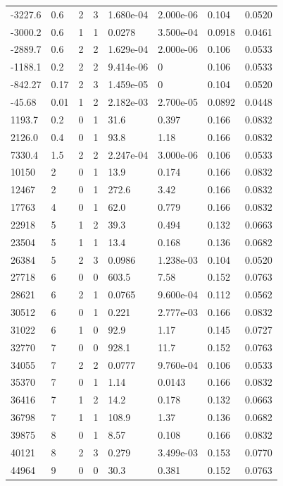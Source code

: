 \documentclass[preview]{standalone}
\begin{document}
{{\begin{tabular}{L{1.2cm}C{1.2cm} C{0.3cm}C{0.5cm} C{1.4cm}C{1.4cm} C{1.4cm}C{1.4cm}}
  -3227.6  &   0.6  & 2     &  3 &  1.680e-04  & 2.000e-06  & 0.104 &  0.0520   \\ 
  -3000.2  &   0.6  & 1     &  1 &  0.0278  & 3.500e-04  & 0.0918 &  0.0461   \\ 
  -2889.7  &   0.6  & 2     &  2 &  1.629e-04  & 2.000e-06  & 0.106 &  0.0533   \\ 
  -1188.1  &   0.2  & 2     &  2 &  9.414e-06  & 0  & 0.106 &  0.0533   \\ 
  -842.27  &  0.17  & 2     &  3 &  1.459e-05  & 0  & 0.104 &  0.0520   \\ 
  -45.68  &  0.01  & 1     &  2 &  2.182e-03  & 2.700e-05  & 0.0892 &  0.0448   \\ 
  1193.7  &   0.2  & 0     &  1 &  31.6  & 0.397  & 0.166 &  0.0832   \\ 
  2126.0  &   0.4  & 0     &  1 &  93.8  & 1.18  & 0.166 &  0.0832   \\ 
  7330.4  &   1.5  & 2     &  2 &  2.247e-04  & 3.000e-06  & 0.106 &  0.0533   \\ 
  10150  &     2  & 0     &  1 &  13.9  & 0.174  & 0.166 &  0.0832   \\ 
  12467  &     2  & 0     &  1 &  272.6  & 3.42  & 0.166 &  0.0832   \\ 
  17763  &     4  & 0     &  1 &  62.0  & 0.779  & 0.166 &  0.0832   \\ 
  22918  &     5  & 1     &  2 &  39.3  & 0.494  & 0.132 &  0.0663   \\ 
  23504  &     5  & 1     &  1 &  13.4  & 0.168  & 0.136 &  0.0682   \\ 
  26384  &     5  & 2     &  3 &  0.0986  & 1.238e-03  & 0.104 &  0.0520   \\ 
  27718  &     6  & 0     &  0 &  603.5  & 7.58  & 0.152 &  0.0763   \\ 
  28621  &     6  & 2     &  1 &  0.0765  & 9.600e-04  & 0.112 &  0.0562   \\ 
  30512  &     6  & 0     &  1 &  0.221  & 2.777e-03  & 0.166 &  0.0832   \\ 
  31022  &     6  & 1     &  0 &  92.9  & 1.17  & 0.145 &  0.0727   \\ 
  32770  &     7  & 0     &  0 &  928.1  & 11.7  & 0.152 &  0.0763   \\ 
  34055  &     7  & 2     &  2 &  0.0777  & 9.760e-04  & 0.106 &  0.0533   \\ 
  35370  &     7  & 0     &  1 &  1.14  & 0.0143  & 0.166 &  0.0832   \\ 
  36416  &     7  & 1     &  2 &  14.2  & 0.178  & 0.132 &  0.0663   \\ 
  36798  &     7  & 1     &  1 &  108.9  & 1.37  & 0.136 &  0.0682   \\ 
  39875  &     8  & 0     &  1 &  8.57  & 0.108  & 0.166 &  0.0832   \\ 
  40121  &     8  & 2     &  3 &  0.279  & 3.499e-03  & 0.153 &  0.0770   \\ 
  44964  &     9  & 0     &  0 &  30.3  & 0.381  & 0.152 &  0.0763   \\ 
\hline 
\end{tabular} 

}}
\end{document}
